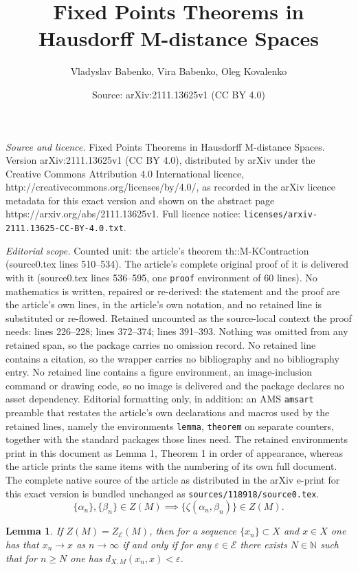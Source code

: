 \documentclass[10pt,a4paper]{amsart}
\title{Fixed Points Theorems in Hausdorff M-distance Spaces}
\author{Vladyslav Babenko, Vira Babenko, Oleg Kovalenko}
\date{Source: arXiv:2111.13625v1 (CC BY 4.0)}
\newtheorem{lemma}{Lemma}
\newcommand{\EE}{\mathcal{E}}
\newcommand{\NN}{\mathbb N}
\begin{document}
\maketitle

\noindent\emph{Source and licence.} Fixed Points Theorems in Hausdorff M-distance Spaces. Version arXiv:2111.13625v1 (CC BY 4.0), distributed by arXiv under the Creative Commons Attribution 4.0 International licence, http://creativecommons.org/licenses/by/4.0/, as recorded in the arXiv licence metadata for this exact version and shown on the abstract page https://arxiv.org/abs/2111.13625v1. Full licence notice: \texttt{licenses/arxiv-2111.13625-CC-BY-4.0.txt}.\par\smallskip

\noindent\textit{Editorial scope.} Counted unit: the article's theorem th::M-KContraction (source0.tex lines 510--534). The article's complete original proof of it is delivered with it (source0.tex lines 536--595, one \texttt{proof} environment of 60 lines). No mathematics is written, repaired or re-derived: the statement and the proof are the article's own lines, in the article's own notation, and no retained line is substituted or re-flowed.  Retained uncounted as the source-local context the proof needs: lines 226--228; lines 372--374; lines 391--393.  Nothing was omitted from any retained span, so the package carries no omission record.  No retained line contains a citation, so the wrapper carries no bibliography and no bibliography entry.  No retained line contains a figure environment, an image-inclusion command or drawing code, so no image is delivered and the package declares no asset dependency.  Editorial formatting only, in addition: an AMS \texttt{amsart} preamble that restates the article's own declarations and macros used by the retained lines, namely the environments \texttt{lemma}, \texttt{theorem} on separate counters, together with the standard packages those lines need.  The retained environments print in this document as Lemma 1, Theorem 1 in order of appearance, whereas the article prints the same items with the numbering of its own full document.  The complete native source of the article as distributed in the arXiv e-print for this exact version is bundled unchanged as \texttt{sources/118918/source0.tex}.
\begin{equation}\label{zetaIsNullSq}
    \{\alpha_n\},\{\beta_n\}\in Z(M) \implies  \{\zeta (\alpha_n,\beta_n)\}\in Z(M).
\end{equation}

\begin{lemma}\label{l::econvergence}
If $Z(M) = Z_{\EE}(M)$, then for a sequence $\{ x_n\}\subset X$ and $x\in X$ one has that $x_n\to x$ {as} $n\to\infty$ if and only if for any $\varepsilon\in \EE$ there exists $N\in\NN$ such that for $n\geq N$ one has $d_{X,M}(x_n,x)< \varepsilon$.
\end{lemma}
\end{document}

